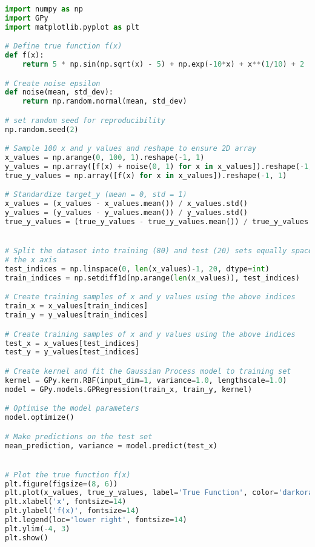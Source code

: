 \documentclass[12pt,a4paper]{article}
\begin{document}
\vspace{10pt}
\begin{lstlisting}[language=python, caption={Code of the Creation of Figure \ref{fig:GP meth}}]
import numpy as np
import GPy
import matplotlib.pyplot as plt

# Define true function f(x)
def f(x):
    return 5 * np.sin(np.sqrt(x) - 5) + np.exp(-10*x) + x**(1/10) + 2

# Create noise epsilon
def noise(mean, std_dev):
    return np.random.normal(mean, std_dev)

# set random seed for reproducibility
np.random.seed(2)

# Sample 100 x and y values and reshape to ensure 2D array
x_values = np.arange(0, 100, 1).reshape(-1, 1)  
y_values = np.array([f(x) + noise(0, 1) for x in x_values]).reshape(-1, 1)
true_y_values = np.array([f(x) for x in x_values]).reshape(-1, 1)

# Standardize target_y (mean = 0, std = 1)
x_values = (x_values - x_values.mean()) / x_values.std()
y_values = (y_values - y_values.mean()) / y_values.std()
true_y_values = (true_y_values - true_y_values.mean()) / true_y_values.std()


# Split the dataset into training (80) and test (20) sets equally spaced across
# the x axis
test_indices = np.linspace(0, len(x_values)-1, 20, dtype=int)
train_indices = np.setdiff1d(np.arange(len(x_values)), test_indices)

# Create training samples of x and y values using the above indices
train_x = x_values[train_indices]
train_y = y_values[train_indices]

# Create training samples of x and y values using the above indices
test_x = x_values[test_indices]
test_y = y_values[test_indices]

# Create kernel and fit the Gaussian Process model to training set
kernel = GPy.kern.RBF(input_dim=1, variance=1.0, lengthscale=1.0)
model = GPy.models.GPRegression(train_x, train_y, kernel)

# Optimise the model parameters
model.optimize()

# Make predictions on the test set
mean_prediction, variance = model.predict(test_x)


# Plot the true function f(x) 
plt.figure(figsize=(8, 6))
plt.plot(x_values, true_y_values, label='True Function', color='darkorange', linewidth=3)
plt.xlabel('x', fontsize=14)
plt.ylabel('f(x)', fontsize=14)
plt.legend(loc='lower right', fontsize=14)
plt.ylim(-4, 3) 
plt.show()


\end{lstlisting}
\end{document}
